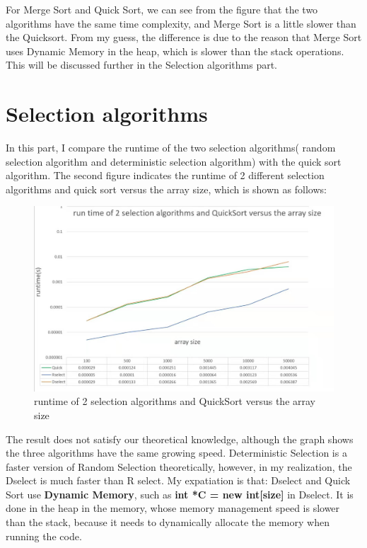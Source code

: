 \documentclass[12pt,a4paper]{article}
\theoremstyle{definition}
\begin{document}
For Merge Sort and Quick Sort, we can see from the figure that the two algorithms have the same time complexity, and  Merge Sort is a little slower than the Quicksort. From my guess, the difference is due to the reason that Merge Sort uses Dynamic Memory in the heap, which is slower than the stack operations. This will be discussed further in the Selection algorithms part.

\newpage
\section{Selection algorithms}

In this part, I compare the runtime of the two selection algorithms( random selection algorithm and deterministic selection algorithm) with the quick sort algorithm. The second figure indicates the runtime of 2 different selection algorithms and quick sort versus the array size, which is shown as follows:

\begin{figure}[ht]
	\centering
	\includegraphics[scale=0.3]{Lab03_2.jpg}
	\caption{runtime of 2 selection algorithms and QuickSort versus the array size}
\end{figure}

The result does not satisfy our theoretical knowledge, although the graph shows the three algorithms have the same growing speed. Deterministic Selection is a faster version of Random Selection theoretically, however, in my realization, the Dselect is much faster than R select. My expatiation is that: Dselect and Quick Sort use\textbf{ Dynamic Memory}, such as \textbf{int *C = new  int[size]} in Dselect. It is done in the heap in the memory, whose memory management speed is slower than the stack, because it needs to dynamically allocate the memory when running the code. 
\end{document}
